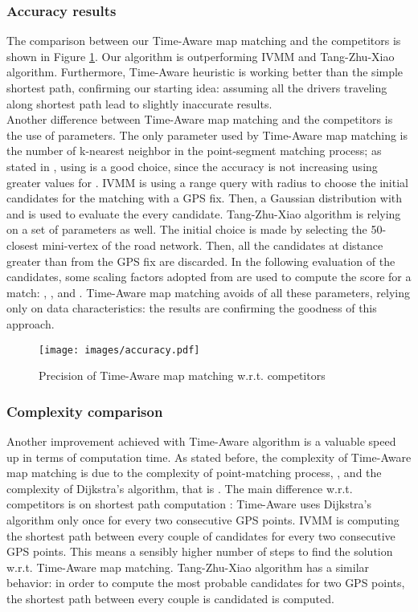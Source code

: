 \documentclass[5p]{elsarticle}
\begin{document}
\subsubsection{Accuracy results}
The comparison between our Time-Aware map matching and the competitors is shown in Figure \ref{precision}. Our algorithm is outperforming IVMM and Tang-Zhu-Xiao algorithm. 
Furthermore, Time-Aware heuristic is working better than the simple shortest path, confirming our starting idea: 
assuming all the drivers traveling along shortest path lead to slightly inaccurate
results. 
\\
Another difference between Time-Aware map matching and the competitors is the use of parameters. The only parameter used by Time-Aware map matching is 
the number of k-nearest neighbor in the point-segment matching process; as stated in \cite{cintia2013gravity}, using  is a good choice, since the accuracy is not increasing 
using greater values for . IVMM is using a range query with radius  to choose the initial candidates for the matching with a GPS fix.  
Then, a Gaussian distribution with  and  is used to evaluate the every candidate. Tang-Zhu-Xiao algorithm is relying on a set of parameters as well. 
The initial choice is made by selecting the 50-closest mini-vertex of the road network. Then, all the candidates at distance greater than  from the GPS fix are discarded.
In the following evaluation of the candidates, some scaling factors adopted from \cite{brakatsoulas2005map} are used to compute the score for a match:  , ,  and . Time-Aware map matching avoids of all these parameters, relying only on data characteristics: the results are confirming the goodness of this approach.  

\begin{figure}[h!]

\centering
\hspace{-2cm}\texttt{[image: images/accuracy.pdf]}
\caption{Precision of Time-Aware map matching w.r.t. competitors}
\label{precision}
\end{figure}



\subsubsection{Complexity comparison} 
Another improvement achieved with Time-Aware algorithm is a valuable speed up in terms of computation time. 
As stated before, the complexity of Time-Aware map matching is due to the complexity of point-matching process, , 
and the complexity of Dijkstra's algorithm, that is .
The main difference w.r.t. competitors is on shortest path computation : Time-Aware uses Dijkstra's algorithm only once for 
every two consecutive GPS points. 
IVMM is computing the shortest path between every couple of candidates for every two consecutive GPS points. 
This means a sensibly higher number of steps to find the solution
w.r.t. 
Time-Aware map matching. Tang-Zhu-Xiao algorithm has a similar behavior: 
in order to compute the most probable candidates for two GPS points, the shortest path between every couple
is candidated is computed.  
\end{document}
